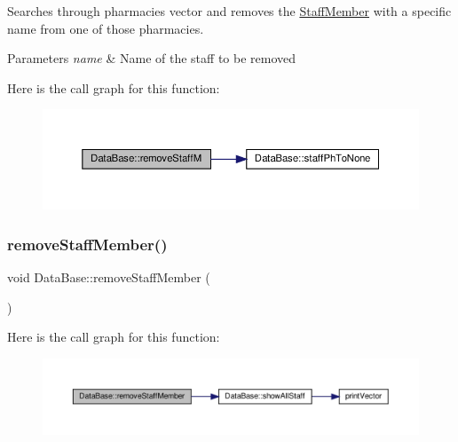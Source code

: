 Searches through pharmacies vector and removes the \hyperlink{classStaffMember}{Staff\+Member} with a specific name from one of those pharmacies. 


\begin{DoxyParams}{Parameters}
{\em name} & Name of the staff to be removed \\
\hline
\end{DoxyParams}
Here is the call graph for this function\+:\nopagebreak
\begin{figure}[H]
\begin{center}
\leavevmode
\includegraphics[width=350pt]{classDataBase_a79dbf45f9b1a60fd5a29505f44e188e0_cgraph}
\end{center}
\end{figure}
\mbox{\label{classDataBase_a26ab8f3d2cb6d78a5105e72c2377c21c}} 
\subsubsection{\texorpdfstring{remove\+Staff\+Member()}{removeStaffMember()}}
{\footnotesize\ttfamily void Data\+Base\+::remove\+Staff\+Member (\begin{DoxyParamCaption}{ }\end{DoxyParamCaption})}

Here is the call graph for this function\+:\nopagebreak
\begin{figure}[H]
\begin{center}
\leavevmode
\includegraphics[width=350pt]{classDataBase_a26ab8f3d2cb6d78a5105e72c2377c21c_cgraph}
\end{center}
\end{figure}
\mbox{\label{classDataBase_af4762294e1b25415f7de88f0e8d6d90f}} 
